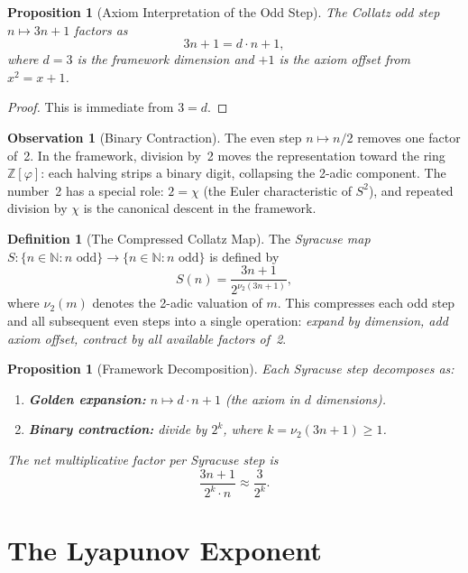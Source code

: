 \documentclass[11pt,a4paper]{article}
\newtheorem{proposition}[theorem]{Proposition}
\theoremstyle{definition}
\newtheorem{definition}[theorem]{Definition}
\newtheorem{observation}[theorem]{Observation}
\newcommand{\ZZ}{\mathbb{Z}}
\newcommand{\NN}{\mathbb{N}}
\begin{document}
\begin{proposition}[Axiom Interpretation of the Odd Step]\label{prop:odd-step}
The Collatz odd step $n \mapsto 3n + 1$ factors as
\[
  3n + 1 = d \cdot n + 1,
\]
where $d = 3$ is the framework dimension and $+1$ is the axiom offset from
$x^2 = x + 1$.
\end{proposition}

\begin{proof}
This is immediate from $3 = d$.
\end{proof}

\begin{observation}[Binary Contraction]
The even step $n \mapsto n/2$ removes one factor of~2. In the framework,
division by~2 moves the representation toward the ring $\ZZ[\varphi]$: each
halving strips a binary digit, collapsing the 2-adic component. The number~2
has a special role: $2 = \chi$ (the Euler characteristic of $S^2$), and
repeated division by $\chi$ is the canonical descent in the framework.
\end{observation}

\begin{definition}[The Compressed Collatz Map]
The \emph{Syracuse map} $S : \{n \in \NN : n \text{ odd}\} \to
\{n \in \NN : n \text{ odd}\}$ is defined by
\[
  S(n) = \frac{3n + 1}{2^{\nu_2(3n+1)}},
\]
where $\nu_2(m)$ denotes the 2-adic valuation of $m$. This compresses each
odd step and all subsequent even steps into a single operation:
\emph{expand by dimension, add axiom offset, contract by all available factors
of~2}.
\end{definition}

\begin{proposition}[Framework Decomposition]\label{prop:decomp}
Each Syracuse step decomposes as:
\begin{enumerate}[nosep]
  \item \textbf{Golden expansion:} $n \mapsto d \cdot n + 1$ (the axiom in
    $d$ dimensions).
  \item \textbf{Binary contraction:} divide by $2^k$, where
    $k = \nu_2(3n+1) \geq 1$.
\end{enumerate}
The net multiplicative factor per Syracuse step is
\[
  \frac{3n + 1}{2^k \cdot n} \approx \frac{3}{2^k}.
\]
\end{proposition}

\section{The Lyapunov Exponent}\label{sec:lyapunov}
\end{document}
